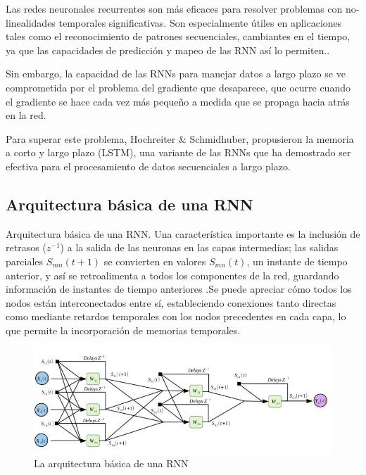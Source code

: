 Las redes neuronales recurrentes son más eficaces para resolver problemas con no­linealidades temporales significativas. Son especialmente útiles en aplicaciones tales
como el reconocimiento de patrones secuenciales, cambiantes en el tiempo, ya que las capacidades de predicción y mapeo de las RNN así lo permiten\cite{montesdeoca2016estudios}..

Sin embargo, la capacidad de las RNNs para manejar datos a largo plazo se ve comprometida por el problema del gradiente que desaparece, que ocurre cuando el gradiente se hace cada vez más pequeño a medida que se propaga hacia atrás en la red\cite{tomas2023prediccion}.


Para  superar  este  problema,  Hochreiter \& Schmidhuber,  propusieron  la  memoria  a  corto  y  largo  plazo  (LSTM),  una  variante  de  las  RNNs  que  ha  demostrado  ser efectiva para el procesamiento de datos secuenciales a largo plazo\cite{tomas2023prediccion}.



\subsection{Arquitectura básica de una RNN}
Arquitectura básica de una RNN. Una característica importante es la inclusión de retrasos ($z^{-1}$) a la salida de las neuronas en las capas intermedias; las salidas parciales $S_{mn}(t + 1)$ se convierten en valores $S_{mn}(t)$, un instante de tiempo anterior, y así se retroalimenta a todos los componentes de la red, guardando información de instantes de tiempo anteriores \cite{montesdeoca2016estudios}.Se puede apreciar cómo todos los nodos están interconectados entre sí, estableciendo conexiones tanto directas como mediante retardos temporales con los nodos precedentes en cada capa, lo que permite la incorporación de memorias temporales.

\begin{figure}[H]
  \begin{center}
    \includegraphics[scale=0.70]{./redes_recurrentes.png}
    \caption{La arquitectura básica de una RNN}
    \label{fig:red_recurreente}
  \end{center}
\end{figure}

